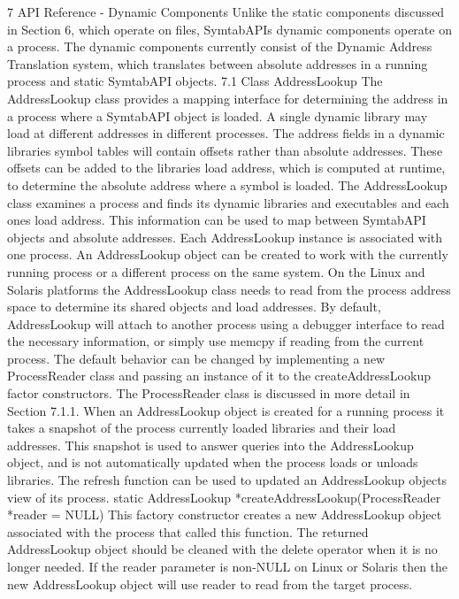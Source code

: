 7 API Reference - Dynamic Components
Unlike the static components discussed in Section 6, which operate on files, SymtabAPIs dynamic components operate on a process. The dynamic components currently consist of the Dynamic Address Translation system, which translates between absolute addresses in a running process and static SymtabAPI objects. 
7.1 Class AddressLookup
The AddressLookup class provides a mapping interface for determining the address in a process where a SymtabAPI object is loaded. A single dynamic library may load at different addresses in different processes. The address fields in a dynamic libraries symbol tables will contain offsets rather than absolute addresses. These offsets can be added to the libraries load address, which is computed at runtime, to determine the absolute address where a symbol is loaded. 
The AddressLookup class examines a process and finds its dynamic libraries and executables and each ones load address. This information can be used to map between SymtabAPI objects and absolute addresses. Each AddressLookup instance is associated with one process. An AddressLookup object can be created to work with the currently running process or a different process on the same system.
On the Linux and Solaris platforms the AddressLookup class needs to read from the process address space to determine its shared objects and load addresses. By default, AddressLookup will attach to another process using a debugger interface to read the necessary information, or simply use memcpy if reading from the current process. The default behavior can be changed by implementing a new ProcessReader class and passing an instance of it to the createAddressLookup factor constructors. The ProcessReader class is discussed in more detail in Section 7.1.1.
When an AddressLookup object is created for a running process it takes a snapshot of the process currently loaded libraries and their load addresses. This snapshot is used to answer queries into the AddressLookup object, and is not automatically updated when the process loads or unloads libraries. The refresh function can be used to updated an AddressLookup objects view of its process.
static AddressLookup *createAddressLookup(ProcessReader *reader = NULL)
This factory constructor creates a new AddressLookup object associated with the process that called this function. The returned AddressLookup object should be cleaned with the delete operator when it is no longer needed.
If the reader parameter is non-NULL on Linux or Solaris then the new AddressLookup object will use reader to read from the target process.
